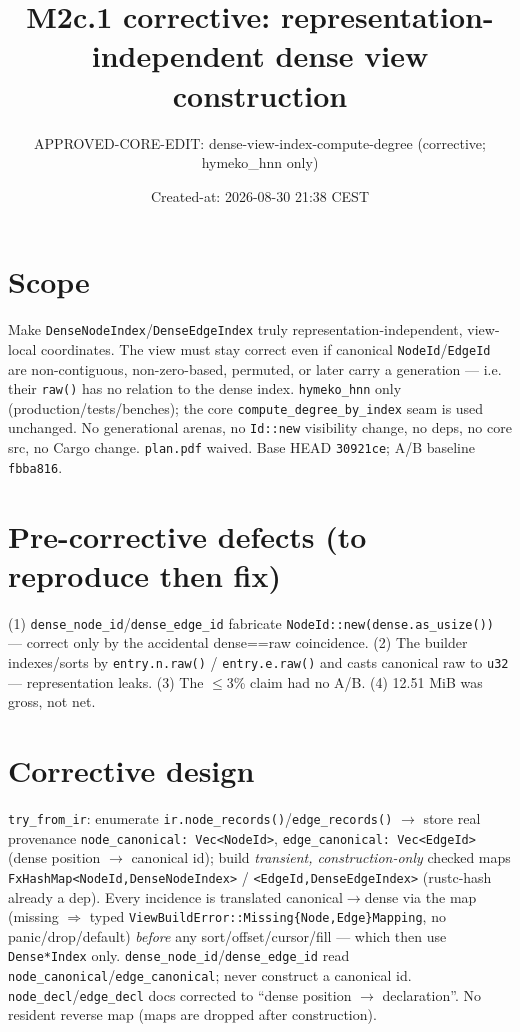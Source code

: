 \documentclass[11pt]{article}
\title{M2c.1 corrective: representation-independent dense view construction}
\author{APPROVED-CORE-EDIT: dense-view-index-compute-degree (corrective; hymeko\_hnn only)}
\date{Created-at: 2026-08-30 21:38 CEST}
\begin{document}
\maketitle
\section*{Scope}
Make \texttt{DenseNodeIndex}/\texttt{DenseEdgeIndex} truly representation-independent,
view-local coordinates. The view must stay correct even if canonical
\texttt{NodeId}/\texttt{EdgeId} are non-contiguous, non-zero-based, permuted, or
later carry a generation --- i.e. their \texttt{raw()} has no relation to the dense
index. \texttt{hymeko\_hnn} only (production/tests/benches); the core
\texttt{compute\_degree\_by\_index} seam is used unchanged. No generational arenas,
no \texttt{Id::new} visibility change, no deps, no core src, no Cargo change.
\texttt{plan.pdf} waived. Base HEAD \texttt{30921ce}; A/B baseline \texttt{fbba816}.
\section{Pre-corrective defects (to reproduce then fix)}
(1) \texttt{dense\_node\_id}/\texttt{dense\_edge\_id} fabricate
\texttt{NodeId::new(dense.as\_usize())} --- correct only by the accidental
dense==raw coincidence. (2) The builder indexes/sorts by \texttt{entry.n.raw()} /
\texttt{entry.e.raw()} and casts canonical raw to \texttt{u32} --- representation
leaks. (3) The $\le$3\% claim had no A/B. (4) 12.51 MiB was gross, not net.
\section{Corrective design}
\texttt{try\_from\_ir}: enumerate \texttt{ir.node\_records()}/\texttt{edge\_records()}
$\to$ store real provenance \texttt{node\_canonical: Vec<NodeId>},
\texttt{edge\_canonical: Vec<EdgeId>} (dense position $\to$ canonical id); build
\emph{transient, construction-only} checked maps
\texttt{FxHashMap<NodeId,DenseNodeIndex>} / \texttt{<EdgeId,DenseEdgeIndex>}
(rustc-hash already a dep). Every incidence is translated canonical$\to$dense via
the map (missing $\Rightarrow$ typed \texttt{ViewBuildError::Missing\{Node,Edge\}Mapping},
no panic/drop/default) \emph{before} any sort/offset/cursor/fill --- which then use
\texttt{Dense*Index} only. \texttt{dense\_node\_id}/\texttt{dense\_edge\_id} read
\texttt{node\_canonical}/\texttt{edge\_canonical}; never construct a canonical id.
\texttt{node\_decl}/\texttt{edge\_decl} docs corrected to ``dense position $\to$
declaration''. No resident reverse map (maps are dropped after construction).
\end{document}
